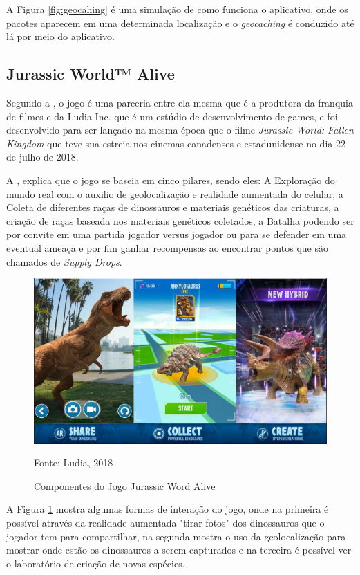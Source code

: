 	A Figura \ref{fig:geocahing} é uma simulação de como funciona o aplicativo, onde os pacotes aparecem em uma determinada localização e o \textit{geocaching} é conduzido até lá por meio do aplicativo.
	\subsection{Jurassic World™ Alive}
	Segundo a , o jogo é uma parceria entre ela mesma que é a produtora da franquia de filmes e da Ludia Inc. que é um estúdio de desenvolvimento de games, e foi desenvolvido para ser lançado na mesma época que o filme \textit{Jurassic World: Fallen Kingdom} que teve sua estreia nos cinemas canadenses e estadunidense no dia 22 de julho de 2018.
	
	A , explica que o jogo se baseia em cinco pilares, sendo eles:
	A Exploração do mundo real com o auxilio de geolocalização e realidade aumentada do celular, a Coleta de diferentes raças de dinossauros e materiais genéticos das criaturas, a criação de raças baseada nos materiais genéticos coletados, a Batalha podendo ser por convite em uma partida jogador versus jogador ou para se defender em uma eventual ameaça e por fim ganhar recompensas ao encontrar pontos que são chamados de \textit{Supply Drops}.
	
	
	\begin{figure}[H]
		\centering
		\includegraphics[scale=0.7]{imagens/jurassicword}
		\caption{Componentes do Jogo Jurassic Word Alive}
		Fonte: Ludia, 2018
		\label{fig:jurassicwordalive}
	\end{figure}
	A Figura \ref{fig:jurassicwordalive} mostra algumas formas de interação do jogo, onde na primeira é possível através da realidade aumentada "tirar fotos" dos dinossauros que o jogador tem para compartilhar, na segunda mostra o uso da geolocalização para mostrar onde estão os dinossauros a serem capturados e na terceira é possível ver o laboratório de criação de novas espécies.
